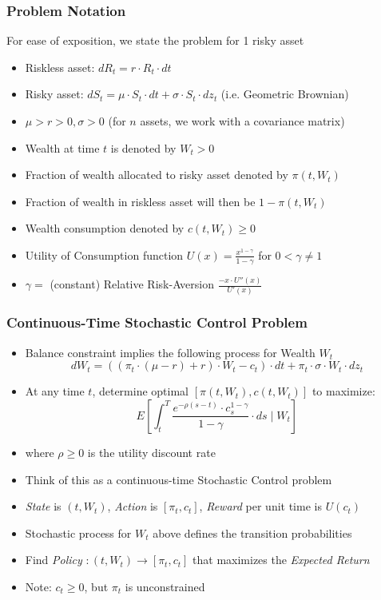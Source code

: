 \documentclass[handout]{beamer}
\begin{document}
\begin{frame}
\frametitle{Problem Notation}
\pause
For ease of exposition, we state the problem for 1 risky asset
\pause
\begin{itemize}[<+->]
\item Riskless asset: $dR_t = r \cdot R_t \cdot dt$
\item Risky asset: $dS_t = \mu \cdot S_t \cdot dt + \sigma \cdot S_t \cdot dz_t$ (i.e. Geometric Brownian)
\item $\mu > r > 0, \sigma > 0$ (for $n$ assets, we work with a covariance matrix)
\item Wealth at time $t$ is denoted by $W_t > 0$
\item Fraction of wealth allocated to risky asset denoted by $\pi(t, W_t)$
\item Fraction of wealth in riskless asset will then be $1 - \pi(t, W_t)$
\item Wealth consumption denoted by $c(t, W_t) \geq 0$
\item Utility of Consumption function $U(x) = \frac {x^{1-\gamma}} {1 - \gamma}$ for $0 < \gamma \neq 1$
\item $\gamma =$ (constant) Relative Risk-Aversion $\frac {-x \cdot U''(x)} {U'(x)}$
\end{itemize}
\end{frame}

\begin{frame}
\frametitle{Continuous-Time Stochastic Control Problem}
\pause
\begin{itemize}[<+->]
\item Balance constraint implies the following process for Wealth $W_t$
$$dW_t = ((\pi_t \cdot (\mu - r) + r) \cdot W_t - c_t) \cdot dt + \pi_t \cdot \sigma \cdot W_t \cdot dz_t$$
\item At any time $t$, determine optimal $[\pi(t,W_t), c(t, W_t)]$ to maximize:
$$E[\int_t^T \frac {e^{-\rho (s-t)} \cdot c_s^{1-\gamma}} {1-\gamma} \cdot ds \mid W_t]$$
\item where $\rho \geq 0$ is the utility discount rate
\item Think of this as a continuous-time Stochastic Control problem
\item {\em State} is $(t, W_t)$, {\em Action} is $[\pi_t, c_t]$, {\em Reward} per unit time is $U(c_t)$
\item Stochastic process for $W_t$ above defines the transition probabilities
\item Find {\em Policy} $: (t, W_t) \rightarrow [\pi_t, c_t]$ that maximizes the {\em Expected Return}
\item Note: $c_t \geq 0$, but $\pi_t$ is unconstrained
\end{itemize}
\end{frame}
\end{document}
